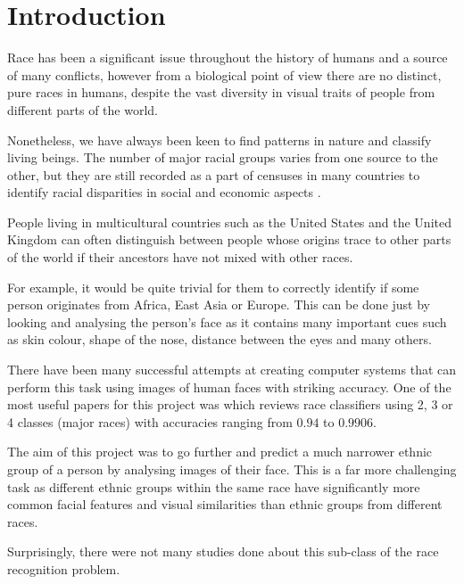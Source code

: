\chapter{Introduction}
\label{introduction}

Race has been a significant issue throughout the history of humans 
and a source of many conflicts, however from a biological point of view
there are no distinct, pure races in humans, despite the vast diversity 
in visual traits of people from different parts of the world. \citep{onRace}

Nonetheless, we have always been keen to find patterns in nature and 
classify living beings. The number of major racial groups varies from 
one source to the other, but they are still recorded as a part of censuses 
in many countries to identify racial disparities in social and economic aspects 
\citep{censusRace}.

People living in multicultural countries such as the United States and the 
United Kingdom can often distinguish between people whose origins trace to other
parts of the world if their ancestors have not mixed with other races.

For example, it would be quite trivial for them to correctly identify if some person
originates from Africa, East Asia or Europe. This can be done just by looking and
analysing the person's face as it contains many important cues such as skin colour, 
shape of the nose, distance between the eyes and many others.

There have been many successful attempts at creating computer systems that can perform
this task using images of human faces with striking accuracy. One of the 
most useful papers for this project was \citep{muhammadg} which reviews 
race classifiers using 2, 3 or 4 classes (major races) with accuracies 
ranging from $0.94$ to $0.9906$.

The aim of this project was to go further and predict a much narrower ethnic group 
of a person by analysing images of their face. This is a far more challenging task 
as different ethnic groups within the same race have significantly more common 
facial features and visual similarities than ethnic groups from different races.

Surprisingly, there were not many studies done about this sub-class of the race 
recognition problem.

